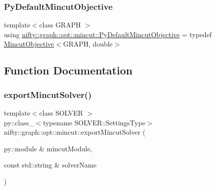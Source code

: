 \subsubsection{\texorpdfstring{Py\+Default\+Mincut\+Objective}{PyDefaultMincutObjective}}
{\footnotesize\ttfamily template$<$class G\+R\+A\+PH $>$ \\
using \hyperlink{namespacenifty_1_1graph_1_1opt_1_1mincut_a0580af1ea835f50c2c67e3903864ea08}{nifty\+::graph\+::opt\+::mincut\+::\+Py\+Default\+Mincut\+Objective} = typedef \hyperlink{classnifty_1_1graph_1_1opt_1_1mincut_1_1MincutObjective}{Mincut\+Objective}$<$G\+R\+A\+PH, double$>$}



\subsection{Function Documentation}
\mbox{\label{namespacenifty_1_1graph_1_1opt_1_1mincut_aeda4464d98c5dab3438e95fb91851183}} 
\subsubsection{\texorpdfstring{export\+Mincut\+Solver()}{exportMincutSolver()}}
{\footnotesize\ttfamily template$<$class S\+O\+L\+V\+ER $>$ \\
py\+::class\+\_\+$<$typename S\+O\+L\+V\+E\+R\+::\+Settings\+Type$>$ nifty\+::graph\+::opt\+::mincut\+::export\+Mincut\+Solver (\begin{DoxyParamCaption}\item[{py\+::module \&}]{mincut\+Module,  }\item[{const std\+::string \&}]{solver\+Name }\end{DoxyParamCaption})}

